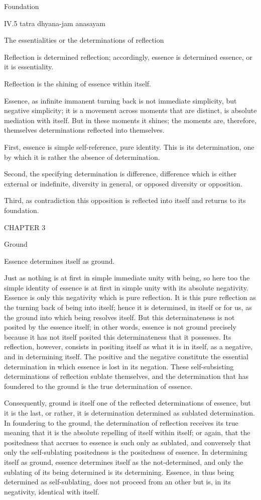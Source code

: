 Foundation

IV.5
tatra dhyana-jam anasayam

The essentialities or the determinations of reflection

Reflection is determined reflection;
accordingly, essence is determined essence, or it is essentiality.

Reflection is the shining of essence within itself.

Essence, as infinite immanent turning back is
not immediate simplicity, but negative simplicity;
it is a movement across moments that are distinct,
is absolute mediation with itself.
But in these moments it shines;
the moments are, therefore, themselves
determinations reflected into themselves.

First, essence is simple self-reference, pure identity.
This is its determination, one by which it is rather
the absence of determination.

Second, the specifying determination is difference,
difference which is either external or indefinite,
diversity in general, or opposed diversity or opposition.

Third, as contradiction this opposition is reflected into itself
and returns to its foundation.

CHAPTER 3

Ground

Essence determines itself as ground.

Just as nothing is at first in simple immediate unity with being,
so here too the simple identity of essence is at first
in simple unity with its absolute negativity.
Essence is only this negativity which is pure reflection.
It is this pure reflection as the turning back of being into itself;
hence it is determined, in itself or for us,
as the ground into which being resolves itself.
But this determinateness is not posited by the essence itself;
in other words, essence is not ground precisely because
it has not itself posited this determinateness that it possesses.
Its reflection, however, consists in positing itself as
what it is in itself, as a negative, and in determining itself.
The positive and the negative constitute the essential determination
in which essence is lost in its negation.
These self-subsisting determinations of reflection sublate themselves,
and the determination that has foundered to the ground is
the true determination of essence.

Consequently, ground is itself one of
the reflected determinations of essence,
but it is the last, or rather,
it is determination determined as sublated determination.
In foundering to the ground, the determination of reflection
receives its true meaning that it is the absolute
repelling of itself within itself;
or again, that the positedness that accrues to essence is
such only as sublated,
and conversely that only the self-sublating positedness is
the positedness of essence.
In determining itself as ground,
essence determines itself as the not-determined,
and only the sublating of its being determined is its determining.
Essence, in thus being determined as self-sublating,
does not proceed from an other but is,
in its negativity, identical with itself.

